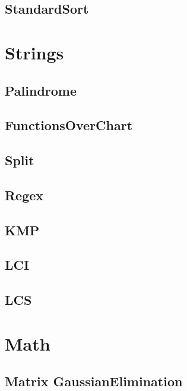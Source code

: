 \subsection{ StandardSort}
\raggedbottom
\hrulefill

\section{Strings}
\subsection{ Palindrome}
\raggedbottom
\hrulefill
\subsection{ FunctionsOverChart}
\raggedbottom
\hrulefill
\subsection{ Split}
\raggedbottom
\hrulefill
\subsection{ Regex}
\raggedbottom
\hrulefill
\subsection{ KMP}
\raggedbottom
\hrulefill
\subsection{ LCI}
\raggedbottom
\hrulefill
\subsection{ LCS}
\raggedbottom
\hrulefill

\section{Math}
\subsection{Matrix GaussianElimination}
\raggedbottom
\hrulefill
